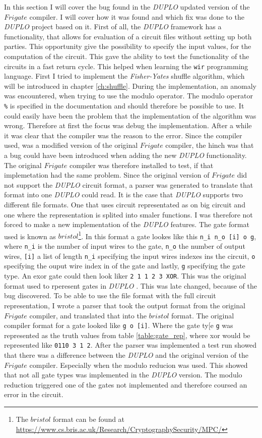 \documentclass[twoside,11pt,openright]{report}
\newcommand{\FY}{\textit{Fisher-Yates} }
\newcommand{\DUPLO}{\textit{DUPLO} }
\begin{document}
In this section I will cover the bug found in the \DUPLO updated version of the $Frigate$ compiler. I will cover how it was found and which fix was done to the \DUPLO project based on it. First of all, the \DUPLO framework has a functionality, that allows for evaluation of a circuit files without setting up both parties. This opportunity give the possibility to specify the input values, for the computation of the circuit. This gave the ability to test the functionality of the circuits in a fast return cycle. This helped when learning the \verb|wir| programming language. First I tried to implement the \FY shuffle algorithm, which will be introduced in chapter \ref{ch:shuffle}. During the implementation, an anomaly was encountered, when trying to use the modulo operator. The modulo operator \verb|%| is specified in the documentation and should therefore be possible to use. It could easily have been the problem that the implementation of the algorithm was wrong. Therefore at first the focus was debug the implementation. After a while it was clear that the compiler was the reason to the error. Since the compiler used, was a modified version of the original $Frigate$ compiler, the hinch was that a bug could have been introduced when adding the new \DUPLO functionality. The original $Frigate$ compiler was therefore installed to test, if that implemetation had the same problem. Since the original version of $Frigate$ did not support the \DUPLO circuit format, a parser was generated to translate that format into one \DUPLO could read. It is the case that \DUPLO supports two different file formats. One that uses circuit representated as on big circuit and one where the representation is splited into smaler functions. I was therefore not forced to make a new implementation of the \DUPLO features. The gate format used is known as $bristol$\footnote{The $bristol$ format can be found at \newline\url{https://www.cs.bris.ac.uk/Research/CryptographySecurity/MPC/}}. In this format a gate lookes like this \verb|n_i n_o [i] o g|, where \verb|n_i| is the number of input wires to the gate, \verb|n_o| the number of output wires, \verb|[i]| a list of length \verb|n_i| specifying the input wires indexes ins the circuit, \verb|o| specifying the ouput wire index in of the gate and lastly, \verb|g| specifying the gate type. An exor gate could then look liker \verb|2 1 1 2 3 XOR|. This was the original format used to rperesent gates in \DUPLO. This was late changed, because of the bug discovered. To be able to use the file format with the full circuit representation, I wrote a parser that took the output format from the original $Frigate$ compiler, and translated that into the $bristol$ format. The original compiler format for a gate looked like \verb|g o [i]|. Where the gate ty[e \verb|g| was represented as the truth values from table \ref{table:gate_rep}, where xor would be represented like \verb|0110 3 1 2|. After the parser was implemented a test run showed that there was a difference between the \DUPLO and the original version of the $Frigate$ compiler. Especially when the modulo reducion was used. This showed that not all gate types was implemented in the \DUPLO version. The modulo reduction triggered one of the gates not implemented and therefore coursed an error in the circuit.
\end{document}
